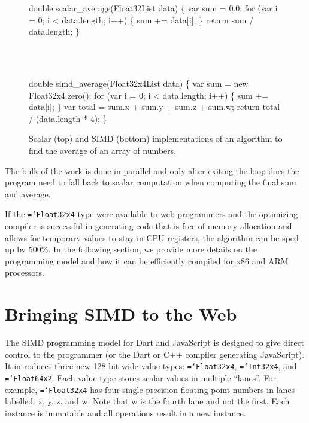 \documentclass[preprint]{sigplanconf}
\newcommand{\ttt}[1]{{\texttt{\hyphenchar\font=`\-\relax #1}}}%
\begin{document}
\begin{figure}
\begin{small}
\begin{program}[style=tt, number=true]
do\tab{}uble scalar\_average(Float32List data) \{
  var sum = 0.0;
  fo\tab{}r (var i = 0; i < data.length; i++) \{
    sum += data[i];\untab{}
  \}
  return sum / data.length;\untab{}
\}
\end{program}
\end{small}
\ \ \\ \ \ \\
\begin{small}
\begin{program}[style=tt, number=true]
do\tab{}uble simd\_average(Float32x4List data) \{
  var sum = new Float32x4.zero();
  fo\tab{}r (var i = 0; i < data.length; i++) \{
    sum += data[i];\untab{}
  \}
  var total = sum.x + sum.y + sum.z + sum.w;
  return total / (data.length * 4);\untab{}
\}
\end{program}
\end{small}
\caption{Scalar (top) and SIMD (bottom) implementations of an algorithm to find
the average of an array of numbers.}
\label{fig:average}
\end{figure}

The bulk of the work is done in parallel and only after exiting the loop
does the program need to fall back to scalar computation when computing the
final sum and average.

If the \ttt{Float32x4} type were available to web programmers and the optimizing
compiler is successful in generating code that is free of memory allocation and
allows for temporary values to stay in CPU registers, the algorithm can be sped
up by 500\%. In the following section, we provide more details on the
programming model and how it can be efficiently compiled for x86 and ARM
processors.

\section{Bringing SIMD to the Web}

The SIMD programming model for Dart and JavaScript is designed to give direct
control to the programmer (or the Dart or C++ compiler generating JavaScript).
It introduces three new 128-bit wide value types: \ttt{Float32x4},
\ttt{Int32x4}, and \ttt{Float64x2}. Each value type stores scalar values in
multiple ``lanes''. For example, \ttt{Float32x4} has four single precision
floating point numbers in lanes labelled: x, y, z, and w. Note that w is the
fourth lane and not the first. Each instance is immutable and all operations
result in a new instance.
\end{document}
